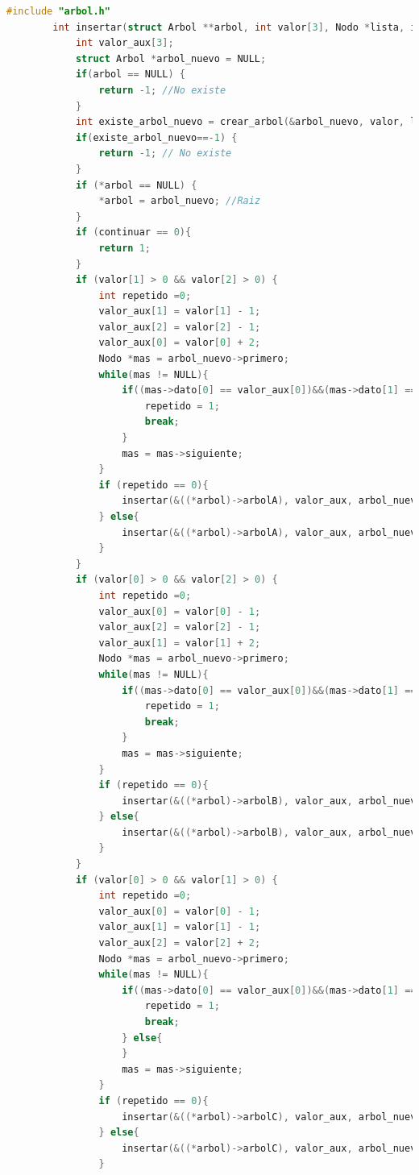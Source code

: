 	\begin{lstlisting}[language=C]
		#include "arbol.h"
		int insertar(struct Arbol **arbol, int valor[3], Nodo *lista, int continuar) {
		    int valor_aux[3];
		    struct Arbol *arbol_nuevo = NULL;
		    if(arbol == NULL) {
		        return -1; //No existe
		    }
		    int existe_arbol_nuevo = crear_arbol(&arbol_nuevo, valor, lista);
		    if(existe_arbol_nuevo==-1) {
		        return -1; // No existe
		    }
		    if (*arbol == NULL) {
		        *arbol = arbol_nuevo; //Raiz
		    }
		    if (continuar == 0){
		        return 1;
		    }
		    if (valor[1] > 0 && valor[2] > 0) {
		        int repetido =0;
		        valor_aux[1] = valor[1] - 1;
		        valor_aux[2] = valor[2] - 1;
		        valor_aux[0] = valor[0] + 2;
		        Nodo *mas = arbol_nuevo->primero;
		        while(mas != NULL){
		            if((mas->dato[0] == valor_aux[0])&&(mas->dato[1] == valor_aux[1])&&(mas->dato[2] == valor_aux[2])) {
		                repetido = 1;
		                break;
		            }
		            mas = mas->siguiente;
		        }
		        if (repetido == 0){
		            insertar(&((*arbol)->arbolA), valor_aux, arbol_nuevo->primero, 1);
		        } else{
		            insertar(&((*arbol)->arbolA), valor_aux, arbol_nuevo->primero, 0);
		        }
		    }
		    if (valor[0] > 0 && valor[2] > 0) {
		        int repetido =0;
		        valor_aux[0] = valor[0] - 1;
		        valor_aux[2] = valor[2] - 1;
		        valor_aux[1] = valor[1] + 2;
		        Nodo *mas = arbol_nuevo->primero;
		        while(mas != NULL){
		            if((mas->dato[0] == valor_aux[0])&&(mas->dato[1] == valor_aux[1])&&(mas->dato[2] == valor_aux[2])) {
		                repetido = 1;
		                break;
		            }
		            mas = mas->siguiente;
		        }
		        if (repetido == 0){
		            insertar(&((*arbol)->arbolB), valor_aux, arbol_nuevo->primero, 1);
		        } else{
		            insertar(&((*arbol)->arbolB), valor_aux, arbol_nuevo->primero, 0);
		        }
		    }
		    if (valor[0] > 0 && valor[1] > 0) {
		        int repetido =0;
		        valor_aux[0] = valor[0] - 1;
		        valor_aux[1] = valor[1] - 1;
		        valor_aux[2] = valor[2] + 2;
		        Nodo *mas = arbol_nuevo->primero;
		        while(mas != NULL){
		            if((mas->dato[0] == valor_aux[0])&&(mas->dato[1] == valor_aux[1])&&(mas->dato[2] == valor_aux[2])) {
		                repetido = 1;
		                break;
		            } else{
		            }
		            mas = mas->siguiente;
		        }
		        if (repetido == 0){
		            insertar(&((*arbol)->arbolC), valor_aux, arbol_nuevo->primero, 1);
		        } else{
		            insertar(&((*arbol)->arbolC), valor_aux, arbol_nuevo->primero, 0);
		        }


\end{lstlisting}
